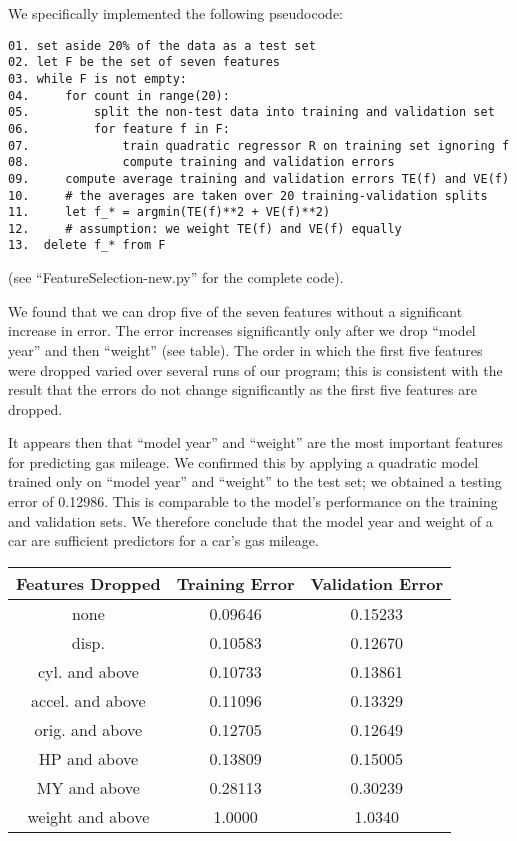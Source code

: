 \documentclass[12pt]{article}
\begin{document}
We specifically implemented the following pseudocode:
\begin{verbatim}
01.	set aside 20% of the data as a test set
02.	let F be the set of seven features
03. while F is not empty:
04.		for count in range(20):
05.			split the non-test data into training and validation set
06.			for feature f in F:
07.				train quadratic regressor R on training set ignoring f
08.				compute training and validation errors
09.		compute average training and validation errors TE(f) and VE(f)
10.		# the averages are taken over 20 training-validation splits
11.		let f_* = argmin(TE(f)**2 + VE(f)**2)
12.		# assumption: we weight TE(f) and VE(f) equally
13.  delete f_* from F
\end{verbatim}
(see ``FeatureSelection-new.py'' for the complete code).

We found that we can drop five of the seven features without a significant increase in error. The error increases significantly only after we drop ``model year'' and then ``weight'' (see table). The order in which the first five features were dropped varied over several runs of our program; this is consistent with the result that the errors do not change significantly as the first five features are dropped.

It appears then that ``model year'' and ``weight'' are the most important features for predicting gas mileage. We confirmed this by applying a quadratic model trained only on ``model year'' and ``weight'' to the test set; we obtained a testing error of 0.12986. This is comparable to the model's performance on the training and validation sets. We therefore conclude that the model year and weight of a car are sufficient predictors for a car's gas mileage.

\begin{center}
\begin{tabular}{|c|c|c|} \hline
Features Dropped & Training Error & Validation Error \\ \hline
none & 0.09646 & 0.15233 \\
disp. & 0.10583 & 0.12670 \\
cyl. and above & 0.10733 & 0.13861 \\
accel. and above & 0.11096 & 0.13329 \\
orig. and above & 0.12705 & 0.12649 \\
HP and above & 0.13809 & 0.15005 \\
MY and above & 0.28113 & 0.30239 \\
weight and above & 1.0000 & 1.0340 \\
\hline
\end{tabular}
\end{center}
\end{document}
